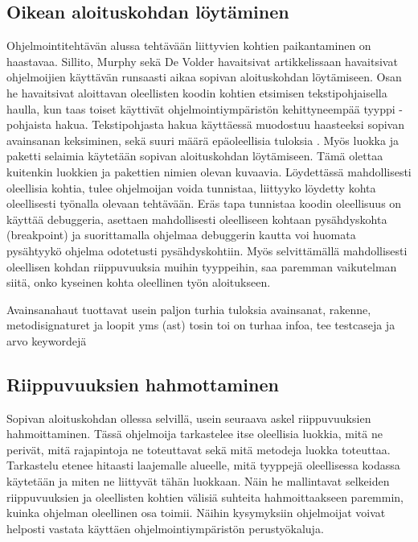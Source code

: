 \documentclass[finnish]{../tktltiki2}
\theoremstyle{definition}
\theoremstyle{remark}
\begin{document}
\subsection{Oikean aloituskohdan löytäminen}
Ohjelmointitehtävän alussa tehtävään liittyvien kohtien paikantaminen on haastavaa. Sillito, Murphy sekä De Volder havaitsivat artikkelissaan \cite{questions-during-software-evolution-tasks} havaitsivat ohjelmoijien käyttävän runsaasti aikaa sopivan aloituskohdan löytämiseen. Osan he havaitsivat aloittavan oleellisten koodin kohtien etsimisen tekstipohjaisella haulla, kun taas toiset käyttivät ohjelmointiympäristön kehittyneempää tyyppi -pohjaista hakua. Tekstipohjasta hakua käyttäessä muodostuu haasteeksi sopivan avainsanan keksiminen, sekä suuri määrä epäoleellisia tuloksia \cite{what-to-search-for}. Myös luokka ja paketti selaimia käytetään sopivan aloituskohdan löytämiseen. Tämä olettaa kuitenkin luokkien ja pakettien nimien olevan kuvaavia. Löydettässä mahdollisesti oleellisia kohtia, tulee ohjelmoijan voida tunnistaa, liittyyko löydetty kohta oleellisesti työnalla olevaan tehtävään. Eräs tapa tunnistaa koodin oleellisuus on käyttää debuggeria, asettaen mahdollisesti oleelliseen kohtaan pysähdyskohta (breakpoint) ja suorittamalla ohjelmaa debuggerin kautta voi huomata pysähtyykö ohjelma odotetusti pysähdyskohtiin. Myös selvittämällä mahdollisesti oleellisen kohdan riippuvuuksia muihin tyyppeihin, saa paremman vaikutelman siitä, onko kyseinen kohta oleellinen työn aloitukseen.

Avainsanahaut tuottavat usein paljon turhia tuloksia
avainsanat, rakenne, metodisignaturet ja loopit yms (ast) tosin toi on turhaa infoa, tee testcaseja ja arvo keywordejä
\subsection{Riippuvuuksien hahmottaminen}
Sopivan aloituskohdan ollessa selvillä, usein \cite{questions-during-software-evolution-tasks} seuraava askel riippuvuuksien hahmoittaminen. Tässä ohjelmoija tarkastelee itse oleellisia luokkia, mitä ne perivät, mitä rajapintoja ne toteuttavat sekä mitä metodeja luokka toteuttaa. Tarkastelu etenee hitaasti laajemalle alueelle, mitä tyyppejä oleellisessa kodassa käytetään ja miten ne liittyvät tähän luokkaan. Näin he mallintavat selkeiden riippuvuuksien ja oleellisten kohtien välisiä suhteita hahmoittaakseen paremmin, kuinka ohjelman oleellinen osa toimii.
Näihin kysymyksiin ohjelmoijat voivat helposti vastata käyttäen ohjelmointiympäristön perustyökaluja.
\end{document}
